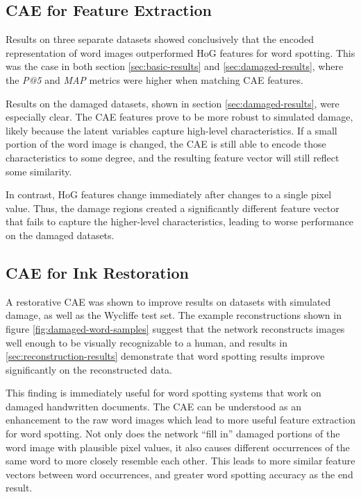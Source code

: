 \documentclass[final]{ukthesis}
\begin{document}
\subsection{CAE for Feature Extraction}
Results on three separate datasets showed conclusively that the encoded representation of word images outperformed HoG features for word spotting. This was the case in both section \ref{sec:basic-results} and \ref{sec:damaged-results}, where the {\em P@5} and {\em MAP} metrics were higher when matching CAE features.

Results on the damaged datasets, shown in section \ref{sec:damaged-results}, were especially clear.  The CAE features prove to be more robust to simulated damage, likely because the latent variables capture high-level characteristics. If a small portion of the word image is changed, the CAE is still able to encode those characteristics to some degree, and the resulting feature vector will still reflect some similarity.

In contrast, HoG features change immediately after changes to a single pixel value. Thus, the damage regions created a significantly different feature vector that fails to capture the higher-level characteristics, leading to worse performance on the damaged datasets.


\subsection{CAE for Ink Restoration}
A restorative CAE was shown to improve results on datasets with simulated damage, as well as the Wycliffe test set. The example reconstructions shown in figure \ref{fig:damaged-word-samples} suggest that the network reconstructs images well enough to be visually recognizable to a human, and results in \ref{sec:reconstruction-results} demonstrate that word spotting results improve significantly on the reconstructed data.

This finding is immediately useful for word spotting systems that work on damaged handwritten documents. The CAE can be understood as an enhancement to the raw word images which lead to more useful feature extraction for word spotting. Not only does the network ``fill in'' damaged portions of the word image with plausible pixel values, it also causes different occurrences of the same word to more closely resemble each other. This leads to more similar feature vectors between word occurrences, and greater word spotting accuracy as the end result.
\end{document}
